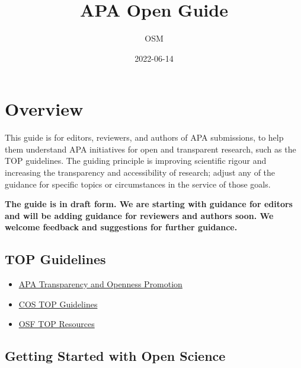 \documentclass[
  oneside]{book}
\title{APA Open Guide}
\author{OSM}
\date{2022-06-14}
\providecommand{\tightlist}{%
  \setlength{\itemsep}{0pt}\setlength{\parskip}{0pt}}
\begin{document}
\maketitle

{
\hypersetup{linkcolor=}
\setcounter{tocdepth}{1}
\tableofcontents
}
\hypertarget{overview}{%
\chapter*{Overview}\label{overview}}

This guide is for editors, reviewers, and authors of APA submissions, to help them understand APA initiatives for open and transparent research, such as the TOP guidelines. The guiding principle is improving scientific rigour and increasing the transparency and accessibility of research; adjust any of the guidance for specific topics or circumstances in the service of those goals.

\textbf{The guide is in draft form. We are starting with guidance for editors and will be adding guidance for reviewers and authors soon. We welcome feedback and suggestions for further guidance.}

\hypertarget{top-guidelines}{%
\section{TOP Guidelines}\label{top-guidelines}}

\begin{itemize}
\tightlist
\item
  \href{https://www.apa.org/pubs/journals/resources/transparency-openness-promotion}{APA Transparency and Openness Promotion}
\item
  \href{https://www.cos.io/initiatives/top-guidelines}{COS TOP Guidelines}
\item
  \href{https://osf.io/9f6gx/}{OSF TOP Resources}
\end{itemize}

\hypertarget{getting-started-with-open-science}{%
\section{Getting Started with Open Science}\label{getting-started-with-open-science}}
\end{document}
